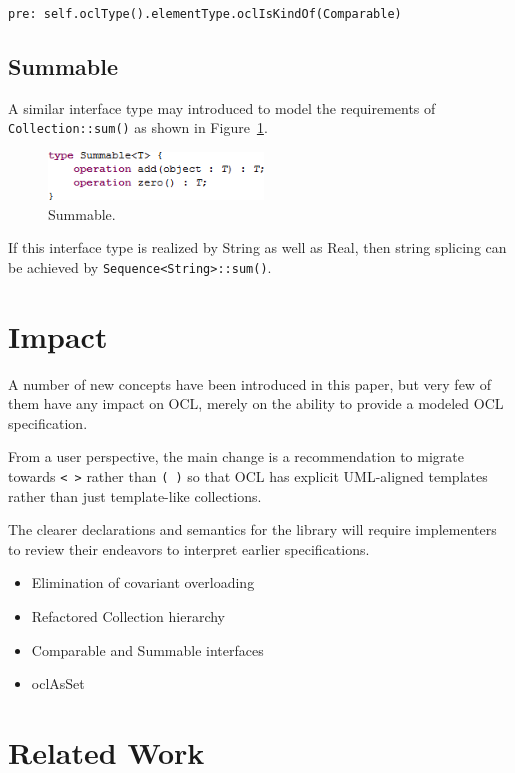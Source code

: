 \documentclass{eceasst}
\begin{document}
\verb|pre: self.oclType().elementType.oclIsKindOf(Comparable)|

\subsection{Summable}

A similar interface type may introduced to model the requirements of \verb|Collection::sum()| as shown in Figure~\ref{fig:Summable}.

\begin{figure}
  \begin{center}
    \includegraphics[width=2.25in]{Summable.png}
  \end{center}
  \caption{Summable.}
  \label{fig:Summable}
\end{figure}

If this interface type is realized by String as well as Real, then string splicing can be achieved by \verb|Sequence<String>::sum()|.

\section{Impact}

A number of new concepts have been introduced in this paper, but very few of them have any impact on OCL, merely on the ability to provide a modeled OCL specification.

From a user perspective, the main change is a recommendation to migrate towards \verb|< >| rather than \verb|( )| so that OCL has explicit UML-aligned templates rather than just template-like collections.

The clearer declarations and semantics for the library will require implementers to review their endeavors to interpret earlier specifications.

\begin{itemize}
\item Elimination of covariant overloading
\item Refactored Collection hierarchy
\item Comparable and Summable interfaces
\item oclAsSet
\end{itemize}

\section{Related Work}
\end{document}
